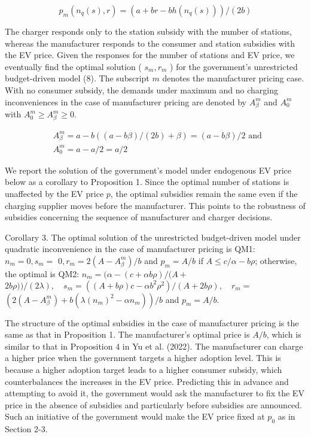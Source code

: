 \documentclass[10pt]{article}
\begin{document}
\begin{equation*}
p_{m}\left(n_{q}(s), r\right)=\left(a+b r-b h\left(n_{q}(s)\right)\right) /(2 b) \tag{19}
\end{equation*}


The charger responds only to the station subsidy with the number of stations, whereas the manufacturer responds to the consumer and station subsidies with the EV price. Given the responses for the number of stations and EV price, we eventually find the optimal solution ( $s_{m}, r_{m}$ ) for the government's unrestricted budget-driven model (8). The subscript $m$ denotes the manufacturer pricing case. With no consumer subsidy, the demands under maximum and no charging inconveniences in the case of manufacturer pricing are denoted by $A_{\beta}^{m}$ and $A_{0}^{m}$ with $A_{0}^{m} \geq A_{\beta}^{m} \geq 0$.


\begin{align*}
& A_{\beta}^{m}=a-b((a-b \beta) /(2 b)+\beta)=(a-b \beta) / 2 \text { and } \\
& A_{0}^{m}=a-a / 2=a / 2 \tag{20}
\end{align*}


We report the solution of the government's model under endogenous EV price below as a corollary to Proposition 1. Since the optimal number of stations is unaffected by the EV price $p$, the optimal subsidies remain the same even if the charging supplier moves before the manufacturer. This points to the robustness of subsidies concerning the sequence of manufacturer and charger decisions.

Corollary 3. The optimal solution of the unrestricted budget-driven model under quadratic inconvenience in the case of manufacturer pricing is QM1: $n_{m}=0, s_{m}=$ $0, r_{m}=2\left(A-A_{\beta}^{m}\right) / b$ and $p_{m}=A / b$ if $A \leq c / \alpha-b \rho$; otherwise, the optimal is QM2: $n_{m}=(\alpha-(c+\alpha b \rho) /(A+$ $2 b \rho)) /(2 \lambda), \quad s_{m}=\left((A+b \rho) c-\alpha b^{2} \rho^{2}\right) /(A+2 b \rho), \quad r_{m}=$ $\left(2\left(A-A_{\beta}^{m}\right)+b\left(\lambda\left(n_{m}\right)^{2}-\alpha n_{m}\right)\right) / b$ and $p_{m}=A / b$.

The structure of the optimal subsidies in the case of manufacturer pricing is the same as that in Proposition 1. The manufacturer's optimal price is $A / b$, which is similar to that in Proposition 4 in Yu et al. (2022). The manufacturer can charge a higher price when the government targets a higher adoption level. This is because a higher adoption target leads to a higher consumer subsidy, which counterbalances the increases in the EV price. Predicting this in advance and attempting to avoid it, the government would ask the manufacturer to fix the EV price in the absence of subsidies and particularly before subsidies are announced. Such an initiative of the government would make the EV price fixed at $p_{0}$ as in Section 2-3.
\end{document}
